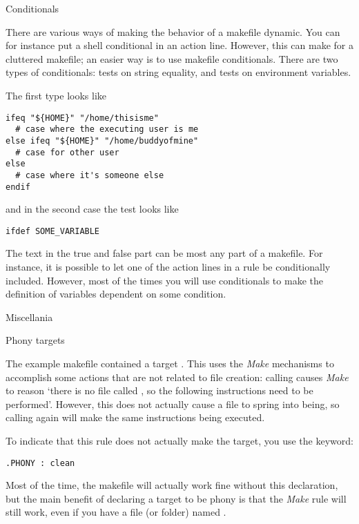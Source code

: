   
 {Conditionals}

There are various ways of making the behavior of a makefile dynamic.
You can for instance put a shell conditional in an action line.
However, this can make for a cluttered makefile; an easier way is to use
makefile conditionals. There are two types of conditionals: tests on string
equality, and tests on environment variables.

The first type looks like
\begin{lstlisting}
ifeq "${HOME}" "/home/thisisme"
  # case where the executing user is me
else ifeq "${HOME}" "/home/buddyofmine"
  # case for other user 
else
  # case where it's someone else
endif
\end{lstlisting}
and in the second case the test looks like
\begin{lstlisting}
ifdef SOME_VARIABLE
\end{lstlisting}
The text in the true and false part can be most any part of a
makefile. For instance, it is possible to let one of the action lines
in a rule be conditionally included. However, most of the times you
will use conditionals to make the definition of variables dependent on
some condition.


 {Miscellania}

 {Phony targets}

The example makefile contained a target . This uses
the \emph{Make} mechanisms to accomplish some actions that are not
related to file creation: calling  causes \emph{Make} to
reason `there is no file called , so the following
instructions need to be performed'. However, this does not actually
cause a file  to spring into being, so calling 
again will make the same instructions being executed.

To indicate that this rule does not actually make the target, you use
the  keyword:
\begin{lstlisting}
.PHONY : clean
\end{lstlisting}
Most of the time, the makefile will actually work fine without this
declaration, but the main benefit of declaring a target to be phony is
that the \emph{Make} rule will still work, even if you have a file (or folder)
named .

